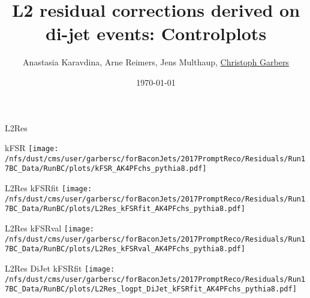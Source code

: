 \documentclass[t,compress]{beamer}
\title[L2 residual corrections]{L2 residual corrections derived on di-jet events: Controlplots}
\author[Christoph Garbers]{Anastasia Karavdina, Arne Reimers, Jens Multhaup, \underline{Christoph Garbers}}
\institute[UHH]{University of Hamburg}
\date{\today}
\begin{document}
\begin{frame}
 \titlepage
\end{frame}

\begin{frame}{L2Res}
\begin{minipage}{0.24\textwidth}
\tiny  kFSR    
 \newline
	\texttt{[image: /nfs/dust/cms/user/garbersc/forBaconJets/2017PromptReco/Residuals/Run17BC\_Data/RunBC/plots/kFSR\_AK4PFchs\_pythia8.pdf]}
\end{minipage}
\begin{minipage}{0.24\textwidth}
\tiny  L2Res kFSRfit    
 \newline
	\texttt{[image: /nfs/dust/cms/user/garbersc/forBaconJets/2017PromptReco/Residuals/Run17BC\_Data/RunBC/plots/L2Res\_kFSRfit\_AK4PFchs\_pythia8.pdf]}
\end{minipage}
\begin{minipage}{0.24\textwidth}
\tiny  L2Res kFSRval    
 \newline
	\texttt{[image: /nfs/dust/cms/user/garbersc/forBaconJets/2017PromptReco/Residuals/Run17BC\_Data/RunBC/plots/L2Res\_kFSRval\_AK4PFchs\_pythia8.pdf]}
\end{minipage}
\begin{minipage}{0.24\textwidth}
\tiny  L2Res   DiJet kFSRfit    
 \newline
	\texttt{[image: /nfs/dust/cms/user/garbersc/forBaconJets/2017PromptReco/Residuals/Run17BC\_Data/RunBC/plots/L2Res\_logpt\_DiJet\_kFSRfit\_AK4PFchs\_pythia8.pdf]}
\end{minipage}
\newline


\end{frame}
\end{document}

